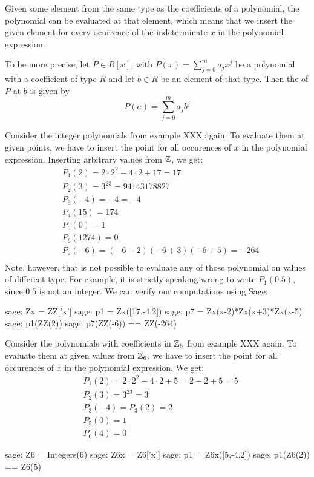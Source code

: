 Given some element from the same type as the coefficients of a polynomial, the polynomial can be evaluated at that element, which means that we insert the given element for every ocurrence of the indeterminate $x$ in the polynomial expression. 

To be more precise, let $P\in R[x]$, with $P(x)=\sum_{j=0}^m a_j x^j$ be a polynomial with a coefficient of type $R$ and let $b\in R$ be an element of that type. Then the  of $P$ at $b$ is given by
\begin{equation}
P(a) = \sum_{j=0}^m a_j b^j
\end{equation}
\begin{example}Consider the integer polynomials from example XXX again. To evaluate them at given points, we have to insert the point for all occurences of $x$ in the polynomial expression. Inserting arbitrary values from $\mathbb{Z}$, we get:
\begin{align*}
 &P_1(2)    = 2\cdot 2^2 -4\cdot 2 +17 = 17 \\
 &P_2(3)    = 3^{23}=94143178827 \\
 &P_3(-4)   = -4 = -4 \\
 &P_4(15)   = 174 \\
 &P_5(0)    = 1 \\
 &P_6(1274) =0 \\
 &P_7(-6)   = (-6-2)(-6+3)(-6+5) = -264 \\
\end{align*}
Note, however, that is not possible to evaluate any of those polynomial on values of different type. For example, it is strictly speaking wrong to write $P_1(0.5)$, since $0.5$ is not an integer. We can verify our computations using Sage:
\begin{sagecommandline}
sage: Zx = ZZ['x']
sage: p1 = Zx([17,-4,2])
sage: p7 = Zx(x-2)*Zx(x+3)*Zx(x-5)
sage: p1(ZZ(2))
sage: p7(ZZ(-6)) == ZZ(-264)
\end{sagecommandline}

\end{example}
\begin{example} Consider the polynomials with coefficients in $\mathbb{Z}_6$ from example XXX again. To evaluate them at given values from $\mathbb{Z}_6$, we have to insert the point for all occurences of $x$ in the polynomial expression. We get:
\begin{align*}
 & P_1(2)= 2\cdot 2^2 -4\cdot 2 +5 = 2 - 2 + 5 = 5\\
 &P_2(3)= 3^{23}=3\\
 &P_3(-4)= P_3(2) = 2\\
 &P_5(0)= 1\\
 &P_6(4)=0
\end{align*}
\begin{sagecommandline}
sage: Z6 = Integers(6)
sage: Z6x = Z6['x']
sage: p1 = Z6x([5,-4,2])
sage: p1(Z6(2)) == Z6(5)
\end{sagecommandline}

\end{example}

